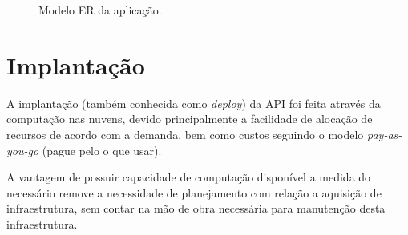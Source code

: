 \documentclass[diss]{template/setrem}
\begin{document}
\begin{figure}
	\centerline{
		\setlength\fboxsep{0pt}
		\setlength\fboxrule{0.5pt}
	}
    
    \caption{Modelo ER da aplicação.}
    \label{fig:er-model}
\end{figure}


\section{Implantação}
A implantação (também conhecida como \emph{deploy}) da API foi feita através da computação nas nuvens, devido principalmente a facilidade de alocação de recursos de acordo com a demanda, bem como custos seguindo o modelo \emph{pay-as-you-go} (pague pelo o que usar).

A vantagem de possuir capacidade de computação disponível a medida do necessário remove a necessidade de planejamento com relação a aquisição de infraestrutura, sem contar na mão de obra necessária para manutenção desta infraestrutura.
\end{document}
